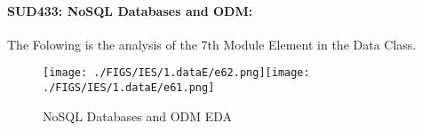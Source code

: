 \documentclass[12pt]{extreport}
\begin{document}
\begin{comment}
\subparagraph{Interpretation of the histogram:}
This Frequency Distribution is (Skeness) with the following descriptive statistics:


\begin{enumerate}
	\item Mean = a
	\item STD = 1.13
	\item Range = 15.5 - 12.5 = 3
	\item IQR = 15 - 13 = 2 
\end{enumerate}
\end{comment}

\paragraph{\large SUD433: NoSQL Databases and ODM:\\
}
The Folowing is the analysis of the 7th Module Element in the Data Class.
\begin{figure}[H]
	\centering
	\texttt{[image: ./FIGS/IES/1.dataE/e62.png]}\texttt{[image: ./FIGS/IES/1.dataE/e61.png]}
	\caption{NoSQL Databases and ODM EDA}
	\label{fig:12}
\end{figure}

\end{document}

